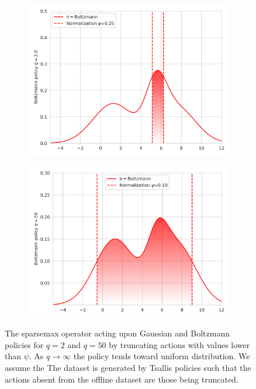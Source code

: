 \documentclass{article}
\begin{document}
\begin{figure}[t]
\begin{subfigure}[b]{0.245\textwidth}
        \includegraphics[width=\textwidth]{img/q2.0_Boltzmann_sparsemax.png}
    \end{subfigure}
    \begin{subfigure}[b]{0.245\textwidth}
        \includegraphics[width=\textwidth]{img/q50_Boltzmann_sparsemax.png}
    \end{subfigure}
    \caption{
        The sparsemax operator acting upon Gaussian and Boltzmann policies for $q=2$ and $q=50$ by truncating actions with values lower than $\psi$. 
    As $q\rightarrow \infty$ the policy tends toward uniform distribution.
    We assume the The dataset is generated by Tsallis policies such that the actions absent from the offline dataset are those being truncated.
    }
    \label{fig:q_truncation}
\end{figure}
\end{document}
